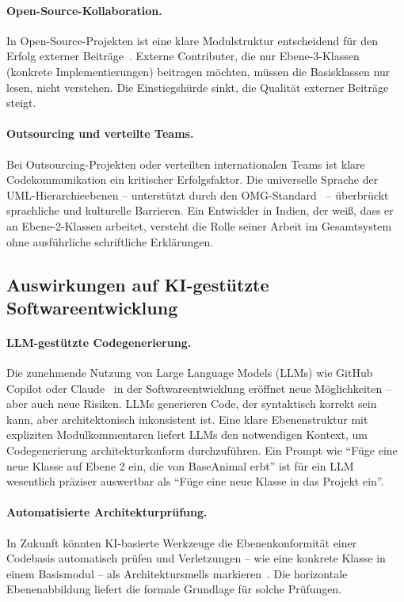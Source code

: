 ﻿\documentclass[a4paper,12pt]{article}
\begin{document}
\paragraph{Open-Source-Kollaboration.}
In Open-Source-Projekten ist eine klare Modulstruktur entscheidend für den
Erfolg externer Beiträge~\cite{raymond1999}. Externe Contributer, die nur
Ebene-3-Klassen (konkrete Implementierungen) beitragen möchten, müssen die
Basisklassen nur lesen, nicht verstehen. Die Einstiegshürde sinkt, die
Qualität externer Beiträge steigt.

\paragraph{Outsourcing und verteilte Teams.}
Bei Outsourcing-Projekten oder verteilten internationalen Teams ist klare
Codekommunikation ein kritischer Erfolgsfaktor. Die universelle Sprache der
UML-Hierarchieebenen -- unterstützt durch den OMG-Standard~\cite{omg2017} --
überbrückt sprachliche und kulturelle Barrieren. Ein Entwickler in Indien,
der weiß, dass er an Ebene-2-Klassen arbeitet, versteht die Rolle seiner
Arbeit im Gesamtsystem ohne ausführliche schriftliche Erklärungen.

\subsection{Auswirkungen auf KI-gestützte Softwareentwicklung}

\paragraph{LLM-gestützte Codegenerierung.}
Die zunehmende Nutzung von Large Language Models (LLMs) wie GitHub Copilot oder
Claude~\cite{chen2021} in der Softwareentwicklung eröffnet neue Möglichkeiten --
aber auch neue Risiken. LLMs generieren Code, der syntaktisch korrekt sein kann,
aber architektonisch inkonsistent ist. Eine klare Ebenenstruktur mit
expliziten Modulkommentaren liefert LLMs den notwendigen Kontext, um
Codegenerierung architekturkonform durchzuführen. Ein Prompt wie
\enquote{Füge eine neue Klasse auf Ebene 2 ein, die von BaseAnimal erbt} ist
für ein LLM wesentlich präziser auswertbar als \enquote{Füge eine neue Klasse
	in das Projekt ein}.

\paragraph{Automatisierte Architekturprüfung.}
In Zukunft könnten KI-basierte Werkzeuge die Ebenenkonformität einer Codebasis
automatisch prüfen und Verletzungen -- wie eine konkrete Klasse in einem
Basismodul -- als Architektursmells markieren~\cite{tamburri2019}. Die horizontale
Ebenenabbildung liefert die formale Grundlage für solche Prüfungen.
\end{document}
